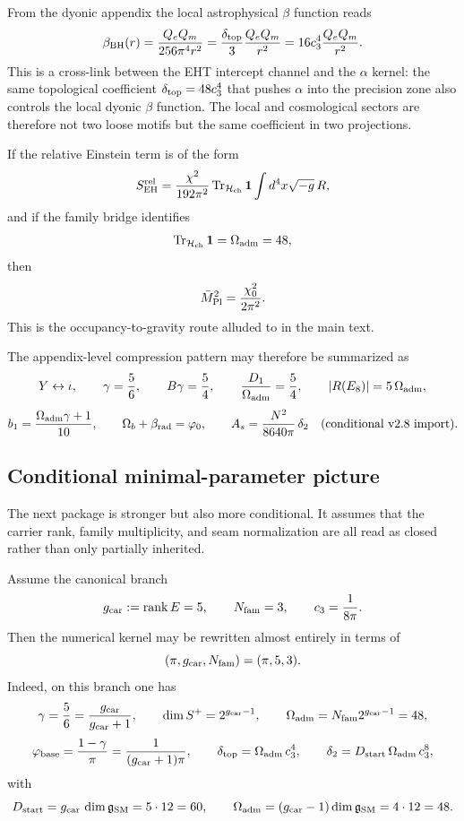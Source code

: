 \begin{remark}
From the dyonic appendix the local astrophysical $\beta$ function reads
\[
\beta_{\mathrm{BH}}(r)=\frac{Q_eQ_m}{256\pi^4 r^2}=\frac{\delta_{\mathrm{top}}}{3}\frac{Q_eQ_m}{r^2}=16c_3^4\frac{Q_eQ_m}{r^2}.
\]
This is a cross-link between the EHT intercept channel and the $\alpha$ kernel: the same topological coefficient $\delta_{\mathrm{top}}=48c_3^4$ that pushes $\alpha$ into the precision zone also controls the local dyonic $\beta$ function. The local and cosmological sectors are therefore not two loose motifs but the same coefficient in two projections.
\end{remark}

\begin{remark}
If the relative Einstein term is of the form
\[
S_{\mathrm{EH}}^{\mathrm{rel}}
=
\frac{\chi^2}{192\pi^2}\operatorname{Tr}_{\mathcal H_{\mathrm{ch}}}\mathbf 1
\int d^4x\sqrt{-g}\,R,
\]
and if the family bridge identifies
\[
\operatorname{Tr}_{\mathcal H_{\mathrm{ch}}}\mathbf 1=\Omega_{\mathrm{adm}}=48,
\]
then
\[
\bar M_{\mathrm{Pl}}^2=\frac{\chi_0^2}{2\pi^2}.
\]
This is the occupancy-to-gravity route alluded to in the main text.
\end{remark}

\begin{remark}
The appendix-level compression pattern may therefore be summarized as
\[
Y \leftrightarrow \iota,
\qquad
\gamma=\frac56,
\qquad
B\gamma=\frac54,
\qquad
\frac{D_1}{\Omega_{\mathrm{adm}}}=\frac54,
\qquad
|R(E_8)|=5\,\Omega_{\mathrm{adm}},
\]
\[
b_1=\frac{\Omega_{\mathrm{adm}}\gamma+1}{10},
\qquad
\Omega_b+\beta_{\mathrm{rad}}=\varphi_0,
\qquad
A_s=\frac{N^2}{8640\pi}\,\delta_2
\quad
\text{(conditional v2.8 import)}.
\]
\end{remark}

\subsection{Conditional minimal-parameter picture}

The next package is stronger but also more conditional. It assumes that the carrier rank, family multiplicity, and seam normalization are all read as closed rather than only partially inherited.

\begin{principle}
Assume the canonical branch
\[
g_{\mathrm{car}}:=\operatorname{rank} E=5,
\qquad
N_{\mathrm{fam}}=3,
\qquad
c_3=\frac{1}{8\pi}.
\]
Then the numerical kernel may be rewritten almost entirely in terms of
\[
(\pi,g_{\mathrm{car}},N_{\mathrm{fam}})=(\pi,5,3).
\]
Indeed, on this branch one has
\[
\gamma=\frac56=\frac{g_{\mathrm{car}}}{g_{\mathrm{car}}+1},
\qquad
\dim S^+=2^{g_{\mathrm{car}}-1},
\qquad
\Omega_{\mathrm{adm}}=N_{\mathrm{fam}}2^{g_{\mathrm{car}}-1}=48,
\]
\[
\varphi_{\mathrm{base}}=\frac{1-\gamma}{\pi}=\frac{1}{(g_{\mathrm{car}}+1)\pi},
\qquad
\delta_{\mathrm{top}}=\Omega_{\mathrm{adm}}\,c_3^4,
\qquad
\delta_2=D_{\mathrm{start}}\,\Omega_{\mathrm{adm}}\,c_3^8,
\]
with
\[
D_{\mathrm{start}}=g_{\mathrm{car}}\,\dim\mathfrak g_{\mathrm{SM}}=5\cdot 12=60,
\qquad
\Omega_{\mathrm{adm}}=(g_{\mathrm{car}}-1)\dim\mathfrak g_{\mathrm{SM}}=4\cdot 12=48.
\]
\end{principle}

